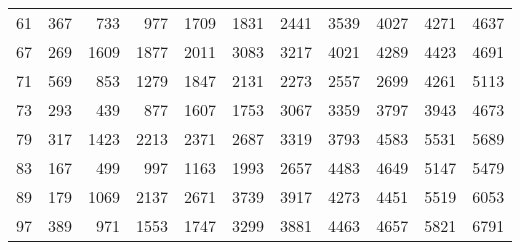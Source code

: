 \documentclass[12pt]{article}
\begin{document}
\begin{tabular}{|r|r|r|r|r|r|r|r|r|r|r|}
61 & 367 & 733 & 977 & 1709 & 1831 & 2441 & 3539 & 4027 & 4271 & 4637 \\
67 & 269 & 1609 & 1877 & 2011 & 3083 & 3217 & 4021 & 4289 & 4423 & 4691 \\
71 & 569 & 853 & 1279 & 1847 & 2131 & 2273 & 2557 & 2699 & 4261 & 5113 \\
73 & 293 & 439 & 877 & 1607 & 1753 & 3067 & 3359 & 3797 & 3943 & 4673 \\
79 & 317 & 1423 & 2213 & 2371 & 2687 & 3319 & 3793 & 4583 & 5531 & 5689 \\
83 & 167 & 499 & 997 & 1163 & 1993 & 2657 & 4483 & 4649 & 5147 & 5479 \\
89 & 179 & 1069 & 2137 & 2671 & 3739 & 3917 & 4273 & 4451 & 5519 & 6053 \\
97 & 389 & 971 & 1553 & 1747 & 3299 & 3881 & 4463 & 4657 & 5821 & 6791 \\
\end{tabular}
\end{document}
